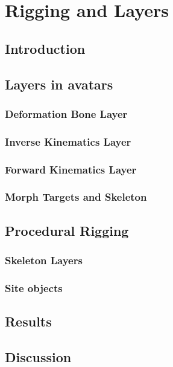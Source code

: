 \documentclass[../../main.tex]{subfiles}
\begin{document}
\chapter{Rigging and Layers}

\section{Introduction}

\section{Layers in avatars}

\subsection{Deformation Bone Layer}

\subsection{Inverse Kinematics Layer}

\subsection{Forward Kinematics Layer}

\subsection{Morph Targets and Skeleton}

\section{Procedural Rigging}

\subsection{Skeleton Layers}

\subsection{Site objects}

\section{Results}

\section{Discussion}
\end{document}
